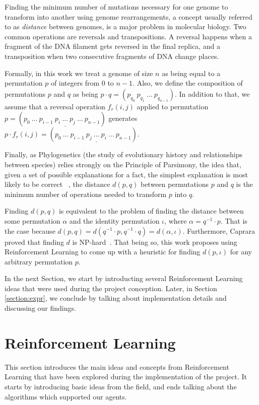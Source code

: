 \documentclass[11pt,twoside]{article}
\begin{document}
Finding the minimum number of mutations necessary for one genome to transform into another using genome rearrangements, a concept usually referred to as \textit{distance} between genomes, is a major problem in molecular biology. Two common operations are reversals and transpositions. A reversal happens when a fragment of the DNA filament gets reversed in the final replica, and a transposition when two consecutive fragments of DNA change places. 

Formally, in this work we treat a genome of size $n$ as being equal to a permutation $p$ of integers from $0$ to $n - 1$. Also, we define the composition of permutations $p$ and $q$ as being $p \cdot q = (p_{q_0}\ p_{q_1}\ \ldots\ p_{q_{n-1}})$. In addition to that, we assume that a reversal operation $f_r(i,j)$ applied to permutation $p = (p_0\ \ldots\ p_{i-1}\ \underline{p_{i}\ \ldots\ p_{j}}\ \ldots\ p_{n-1})$ generates $p \cdot f_r(i,j) = (p_0\ \ldots\ p_{i-1}\ \underline{p_{j}\ \ldots\ p_{i}}\ \ldots\ p_{n-1})$.

Finally, as Phylogenetics (the study of evolutionary history and relationships between species) relies strongly on the Principle of Parsimony, the idea that, given a set of possible explanations for a fact, the simplest explanation is most likely to be correct ~\cite{parsimony}, the distance $d(p, q)$ between permutations $p$ and $q$ is the minimum number of operations needed to transform $p$ into $q$. 

Finding $d(p, q)$ is equivalent to the problem of finding the distance between some permutation $\alpha$ and the identity permutation $\iota$, where $\alpha = q^{-1} \cdot p$. That is the case because $d(p, q) = d(q^{-1} \cdot p, q^{-1} \cdot q) = d(\alpha, \iota)$. Furthermore, Caprara proved that finding $d$ is NP-hard~\cite{caprara1999sorting}. That being so, this work proposes using Reinforcement Learning to come up with a heuristic for finding $d(p, \iota)$ for any arbitrary permutation $p$.

In the next Section, we start by introducting several Reinforcement Learning ideas that were used during the project conception. Later, in Section \ref{section:expr}, we conclude by talking about implementation details and discussing our findings.

\section{Reinforcement Learning}

This section introduces the main ideas and concepts from Reinforcement Learning that have been explored during the implementation of the project. It starts by introducing basic ideas from the field, and ends talking about the algorithms which supported our agents.
\end{document}
